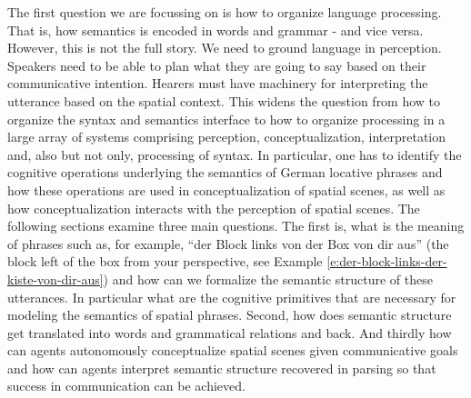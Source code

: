 The first question we are focussing on is how to organize language processing.
That is, how semantics is encoded in words and grammar - and vice versa.
However, this is not the full story. We need to ground language in 
perception. Speakers need to be able to plan what they are going 
to say based on their communicative intention. Hearers must have machinery for
interpreting the utterance based on the spatial context. This widens the question
from how to organize the syntax and semantics interface to how to organize 
processing in a large array of systems comprising perception, conceptualization,
interpretation and, also but not only, processing of syntax. In particular,
one has to identify the cognitive operations underlying the semantics of
German locative phrases and how these operations are used in conceptualization
of spatial scenes, as well as how conceptualization interacts with the
perception of spatial scenes.  The following sections examine three main questions. 
The first is, what is the meaning of phrases such as, for example, 
``der Block links von der Box von dir aus'' (the block left of the box from your 
perspective, see Example \ref{e:der-block-links-der-kiste-von-dir-aus}) and
how can we formalize the semantic structure of these utterances.
In particular what are the cognitive primitives that are necessary for modeling the 
semantics of spatial phrases. Second, how does semantic structure get translated into 
words and grammatical relations and back. And thirdly how can agents 
autonomously conceptualize spatial scenes given
communicative goals and how can agents interpret semantic structure recovered in parsing
so that success in communication can be achieved.

%
% 
%
